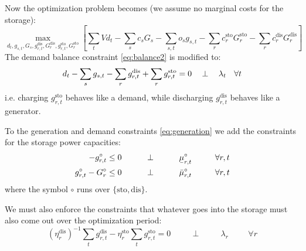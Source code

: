 \documentclass[final,3p,times]{elsarticle}
\newcommand{\ubar}[1]{\text{\b{$#1$}}}
\def\l{\lambda}
\begin{document}
Now the optimization problem becomes (we assume no marginal costs for the storage):
\begin{equation}
    \max_{d_{t}, g_{s,t}, G_s,g^{\textrm{dis}}_{r,t},G^{\textrm{dis}}_{r},g^{\textrm{sto}}_{r,t},G^{\textrm{sto}}_{r}}\left[\sum_{t} Vd_{t} -  \sum_s c_s G_s - \sum_{s,t} o_{s} g_{s,t} -\sum_r c^{\textrm{sto}}_r G^{\textrm{sto}}_r -\sum_r c^{\textrm{dis}}_r G^{\textrm{dis}}_r\right]  \label{eq:objsr}
\end{equation}
The demand balance constraint \eqref{eq:balance2} is modified to:
\begin{align}
   d_{t} - \sum_s g_{s,t} - \sum_r g^{\textrm{dis}}_{r,t} + \sum_r g^{\textrm{sto}}_{r,t}  =  0 \hspace{0.34cm}\perp \hspace{0.34cm} \l_t \hspace{0.34cm} \forall t \label{eq:balance3}
\end{align}
i.e. charging $g^{\textrm{sto}}_{r,t}$ behaves like a demand, while discharging $g^{\textrm{dis}}_{r,t}$ behaves like a generator.

To the generation and demand constraints \eqref{eq:generation} we add the constraints for the storage power capacities:
\begin{align}
    -g^\circ_{r,t}\leq 0 \hspace{1cm}\perp \hspace{1cm} \ubar{\mu}^\circ_{r,t} \hspace{1cm} \forall r,t  \label{eq:storlower2}\\
    g^\circ_{r,t} - G^\circ_r \leq 0 \hspace{1cm}\perp \hspace{1cm} \bar{\mu}^\circ_{r,t} \hspace{1cm} \forall r,t \label{eq:storupper2}
\end{align}
where the symbol $\circ$ runs over $\{\textrm{sto},\textrm{dis}\}$.

We must also enforce the constraints that whatever goes into the storage must also come out over the optimization period:
\begin{equation}
 (\eta_r^{\textrm{dis}})^{-1} \sum_t g^{\textrm{dis}}_{r,t} - \eta_r^{\textrm{sto}}  \sum_t g^{\textrm{sto}}_{r,t}  = 0  \hspace{1cm}\perp \hspace{1cm} \lambda_{r} \hspace{1cm} \forall r \label{eq:storconstraint}
\end{equation}
\end{document}

